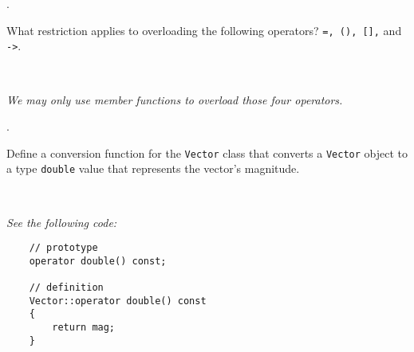 \documentclass{amsart}
\begin{document}
. 
\begin{minipage}[t]{11.5 cm}
	What restriction applies to overloading the following operators? \texttt{=, (), [],} and \texttt{->}.
\end{minipage} \\[1ex]
\phantom{3. } 
\begin{minipage}[t]{11.5 cm}
	{\slshape 
	We may only use member functions to overload those four
	operators.
	}
\end{minipage} 
\vfill

. 
\begin{minipage}[t]{11.5 cm}
	Define a conversion function for the \texttt{Vector} class that converts a \texttt{Vector} object to a type \texttt{double} value that represents the vector's magnitude.
\end{minipage} \\[1ex]
\phantom{2. } 
\begin{minipage}[t]{11.5 cm}
	{\slshape 
	See the following code:
	}
	\begin{verbatim}
	// prototype
	operator double() const;

	// definition
	Vector::operator double() const
	{
	    return mag;
	}
	\end{verbatim}
\end{minipage} 
\vfill
\end{document}
